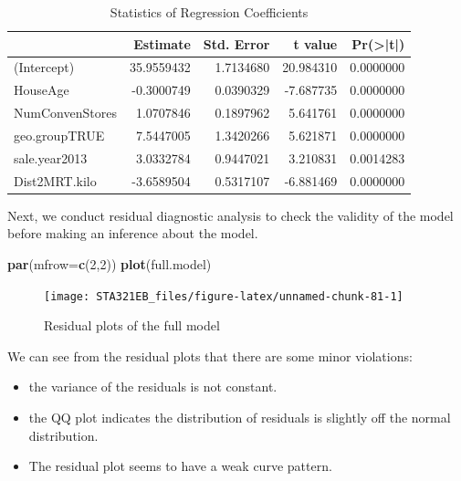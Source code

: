\documentclass[
]{book}
\newenvironment{Shaded}{\begin{snugshade}}{\end{snugshade}}
\newcommand{\AttributeTok}[1]{\textcolor[rgb]{0.13,0.29,0.53}{#1}}
\newcommand{\DecValTok}[1]{\textcolor[rgb]{0.00,0.00,0.81}{#1}}
\newcommand{\FunctionTok}[1]{\textcolor[rgb]{0.13,0.29,0.53}{\textbf{#1}}}
\newcommand{\NormalTok}[1]{#1}
\begin{document}
\begin{table}

\caption{\label{tab:unnamed-chunk-80}Statistics of Regression Coefficients}
\centering
\begin{tabular}[t]{l|r|r|r|r}
\hline
  & Estimate & Std. Error & t value & Pr(>|t|)\\
\hline
(Intercept) & 35.9559432 & 1.7134680 & 20.984310 & 0.0000000\\
\hline
HouseAge & -0.3000749 & 0.0390329 & -7.687735 & 0.0000000\\
\hline
NumConvenStores & 1.0707846 & 0.1897962 & 5.641761 & 0.0000000\\
\hline
geo.groupTRUE & 7.5447005 & 1.3420266 & 5.621871 & 0.0000000\\
\hline
sale.year2013 & 3.0332784 & 0.9447021 & 3.210831 & 0.0014283\\
\hline
Dist2MRT.kilo & -3.6589504 & 0.5317107 & -6.881469 & 0.0000000\\
\hline
\end{tabular}
\end{table}

Next, we conduct residual diagnostic analysis to check the validity of the model before making an inference about the model.

\begin{Shaded}
\begin{Highlighting}[]
\FunctionTok{par}\NormalTok{(}\AttributeTok{mfrow=}\FunctionTok{c}\NormalTok{(}\DecValTok{2}\NormalTok{,}\DecValTok{2}\NormalTok{))}
\FunctionTok{plot}\NormalTok{(full.model)}
\end{Highlighting}
\end{Shaded}

\begin{figure}

{\centering \texttt{[image: STA321EB\_files/figure-latex/unnamed-chunk-81-1]} 

}

\caption{Residual plots of the full model}\label{fig:unnamed-chunk-81}
\end{figure}

We can see from the residual plots that there are some minor violations:

\begin{itemize}
\item
  the variance of the residuals is not constant.
\item
  the QQ plot indicates the distribution of residuals is slightly off the normal distribution.
\item
  The residual plot seems to have a weak curve pattern.
\end{itemize}
\end{document}
